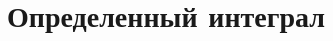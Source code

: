 \documentclass[../main.tex]{subfiles}
\begin{document}
\chapter{Определенный интеграл}


\end{document}
